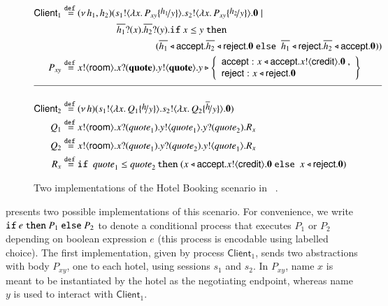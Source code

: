 \documentclass[preprint,11pt]{elsarticle}
\newcommand{\rtype}{\mathsf{room}}
\newcommand{\Quotev}{\mathit{quote}}
\newcommand{\accept}{\mathsf{accept}}
\newcommand{\reject}{\mathsf{reject}}
\newcommand{\creditc}{\mathsf{credit}}
\newcommand{\Client}{\mathsf{Client}}
\begin{document}
{{%
\begin{figure}[t!]
	\begin{align*}%
		 \Client_1    \defeq  &  \newsp{h_1, h_2}{\bout{s_1}{\abs{x}{P_{xy} \subst{h_1}{y}}} \bout{s_2}{\abs{x}{P_{xy} \subst{h_2}{y}}} \inact \Par  \\
		 & 
		\qquad \qquad\binp{\dual{h_1}}{x} \binp{\dual{h_2}}{y}  \If x \leq y\   \Then
		\\
		 & \qquad\qquad \qquad \qquad (\bsel{\dual{h_1}}{\accept} \bsel{\dual{h_2}}{\reject} \inact \ \Else \ \bsel{\dual{h_1}}{\reject} \bsel{\dual{h_2}}{\accept} \inact )
		}
		\\
				 P_{xy}     \defeq &    \bout{x}{\rtype} \binp{x}{\Quotev} \bout{y}{\Quotev}
		y \triangleright \left\{
				\begin{array}{l}
					\accept: \bsel{x}{\accept} \bout{x}{\creditc} \inact~,\\
					\reject: \bsel{x}{\reject} \inact
				\end{array}
				\right\}
				\\[2mm]
				\hline
				\\
						\Client_2 \defeq& \newsp{h}{\bout{s_1}{\abs{x}{Q_1 \subst{h}{y}}} \bout{s_2}{\abs{x}{Q_2 \subst{\dual{h}}{y}}} \inact}
\\
		Q_1 \defeq&	\bout{x}{\rtype} \binp{x}{\Quotev_1} \bout{y}{\Quotev_1} \binp{y}{\Quotev_2} R_x \\
		Q_2 \defeq&	\bout{x}{\rtype} \binp{x}{\Quotev_1} \binp{y}{\Quotev_2} \bout{y}{\Quotev_1} R_x \\
			    R_x  \defeq & \If\ \Quotev_1 \leq \Quotev_2 \, \Then  (\bsel{x}{\accept} \bout{x}{\creditc} \inact \  \Else \ \bsel{x}{\reject} \inact)
	\end{align*}
	\caption{Two implementations of the Hotel Booking scenario in \HOp~\cite{KouzapasPY17}.}\label{f:hotel}
	\end{figure}
%
 presents
two possible \HOp implementations of this scenario.
For convenience, we write 
$\mathtt{if}\  e\ \mathtt{then}\  P_1\ \mathtt{else}\   P_2$
to denote a conditional process that executes $P_1$ or $P_2$ depending on boolean expression $e$ (this process is encodable using labelled choice).
The {first implementation}, given by 
process $\Client_1$, sends two abstractions with body $P_{xy}$, one to each hotel, 
		using sessions $s_1$ and $s_2$.
		In $P_{xy}$, %
			name $x$ is meant to be instantiated by the hotel as the negotiating
		endpoint, whereas name $y$ is used to interact with $\Client_1$.	
}}
\end{document}
